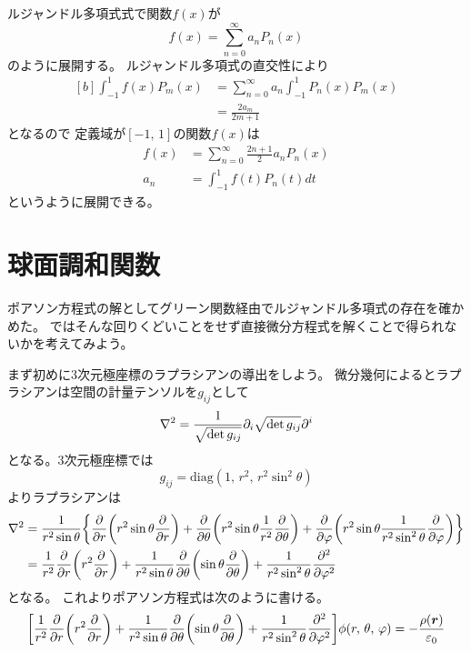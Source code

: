 \documentclass[../../master.tex]{subfiles}
\begin{document}
ルジャンドル多項式式で関数\(f(x)\)が
\begin{equation}
	f(x) = \sum_{n=0}^{\infty} a_n P_n(x)
\end{equation}
のように展開する。
ルジャンドル多項式の直交性により
\begin{equation}\begin{aligned}[b]
    \int_{-1}^{1}f(x) P_m(x) & = \sum_{n=0}^{\infty} a_n \int_{-1}^{1} P_n(x) P_m(x) \\
	                         & = \frac{2a_m}{2m+1}
\end{aligned}\end{equation}
となるので
定義域が\([-1,\,1]\)の関数\(f(x)\)は
\begin{align}
	f(x) & = \sum_{n=0}^{\infty} \frac{2n+1}{2}a_n P_n(x) \\
	a_n  & =\int_{-1}^{1}f(t)P_n(t) dt
\end{align}
というように展開できる。

\section{球面調和関数}
ポアソン方程式の解としてグリーン関数経由でルジャンドル多項式の存在を確かめた。
ではそんな回りくどいことをせず直接微分方程式を解くことで得られないかを考えてみよう。

まず初めに3次元極座標のラプラシアンの導出をしよう。
微分幾何によるとラプラシアンは空間の計量テンソルを\(g_{ij}\)として
\begin{equation}
	\laplacian = \frac{1}{\sqrt{\det g_{ij}}}\partial_i \sqrt{\det g_{ij}}\partial^i
\end{equation}
となる。3次元極座標では
\begin{equation}
	g_{ij} = \text{diag}(1,\,r^2,\,r^2\sin^2\theta)
\end{equation}
よりラプラシアンは
\begin{equation}\begin{aligned}[b]
    \laplacian & = \frac{1}{r^2\sin\theta}\qty{
		\pdv{r}\qty(r^2\sin\theta\pdv{r})
		+\pdv{\theta}\qty(r^2\sin\theta \frac{1}{r^2}\pdv{\theta})
		+\pdv{\varphi}\qty(r^2\sin\theta \frac{1}{r^2\sin^2\theta}\pdv{\varphi})
	}                                                   \\
	           & = \frac{1}{r^2}\pdv{r}\qty(r^2\pdv{r})
	+ \frac{1}{r^2\sin\theta}\pdv{\theta}\qty(\sin\theta\pdv{\theta})
	+ \frac{1}{r^2\sin^2\theta}\pdv[2]{\varphi}
\end{aligned}\end{equation}
となる。
これよりポアソン方程式は次のように書ける。
\begin{equation}
	\qty[\frac{1}{r^2}\pdv{r}\qty(r^2\pdv{r})
		+ \frac{1}{r^2\sin\theta}\pdv{\theta}\qty(\sin\theta\pdv{\theta})
		+ \frac{1}{r^2\sin^2\theta}\pdv[2]{\varphi}] \phi(r,\,\theta,\,\varphi)
	= -\frac{\rho(\vb*{r})}{\varepsilon_0}
\end{equation}
\end{document}
